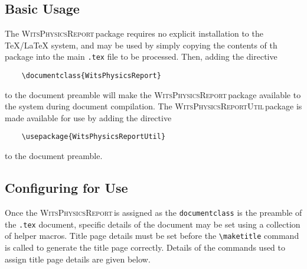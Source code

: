 \documentclass[10pt, a4paper, oneside]{article}
\newcommand{\WitsPhysicsReport}{\textrm{\textsc{WitsPhysicsReport}}\,}
\newcommand{\WitsPhysicsReportUtil}{\textrm{\textsc{WitsPhysicsReportUtil}}\,}
\begin{document}
\subsection{Basic Usage}
\label{sec:Basic Usage}

\par{The \WitsPhysicsReport package requires no explicit installation to the \TeX/\LaTeX{} system, and may be used by simply copying the contents of th package into the  main \lstinline{.tex} file to be processed. Then, adding the directive
\begin{lstlisting}
    \documentclass{WitsPhysicsReport}
\end{lstlisting}
to the document preamble will make the \WitsPhysicsReport package available to the system during document compilation.  The \WitsPhysicsReportUtil package is made available for use by adding the directive
\begin{lstlisting}
    \usepackage{WitsPhysicsReportUtil}
\end{lstlisting}
to the document preamble. }

\subsection{Configuring for Use}
\label{sec:Configuring_for_Use}

\par{Once the \WitsPhysicsReport is assigned as the \lstinline{documentclass} is the preamble of the \lstinline{.tex} document, specific details of the document may be set using a collection of helper macros. Title page details must be set before the \lstinline{\maketitle} command is called to generate the title page correctly. Details of the commands used to assign title page details are given below.}
\end{document}

